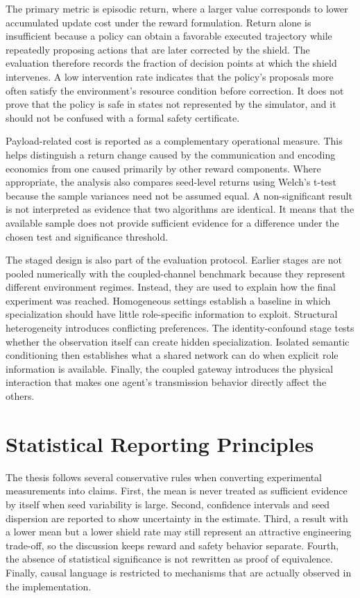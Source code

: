 \documentclass{iutbscthesis}
\begin{document}
The primary metric is episodic return, where a larger value corresponds to lower accumulated update cost under the reward formulation. Return alone is insufficient because a policy can obtain a favorable executed trajectory while repeatedly proposing actions that are later corrected by the shield. The evaluation therefore records the fraction of decision points at which the shield intervenes. A low intervention rate indicates that the policy's proposals more often satisfy the environment's resource condition before correction. It does not prove that the policy is safe in states not represented by the simulator, and it should not be confused with a formal safety certificate.

Payload-related cost is reported as a complementary operational measure. This helps distinguish a return change caused by the communication and encoding economics from one caused primarily by other reward components. Where appropriate, the analysis also compares seed-level returns using Welch's t-test because the sample variances need not be assumed equal. A non-significant result is not interpreted as evidence that two algorithms are identical. It means that the available sample does not provide sufficient evidence for a difference under the chosen test and significance threshold.

The staged design is also part of the evaluation protocol. Earlier stages are not pooled numerically with the coupled-channel benchmark because they represent different environment regimes. Instead, they are used to explain how the final experiment was reached. Homogeneous settings establish a baseline in which specialization should have little role-specific information to exploit. Structural heterogeneity introduces conflicting preferences. The identity-confound stage tests whether the observation itself can create hidden specialization. Isolated semantic conditioning then establishes what a shared network can do when explicit role information is available. Finally, the coupled gateway introduces the physical interaction that makes one agent's transmission behavior directly affect the others.

\section{Statistical Reporting Principles}
The thesis follows several conservative rules when converting experimental measurements into claims. First, the mean is never treated as sufficient evidence by itself when seed variability is large. Second, confidence intervals and seed dispersion are reported to show uncertainty in the estimate. Third, a result with a lower mean but a lower shield rate may still represent an attractive engineering trade-off, so the discussion keeps reward and safety behavior separate. Fourth, the absence of statistical significance is not rewritten as proof of equivalence. Finally, causal language is restricted to mechanisms that are actually observed in the implementation.
\end{document}
